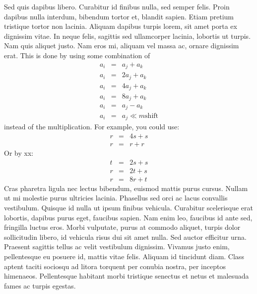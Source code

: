 Sed quis dapibus libero. Curabitur id finibus nulla, sed semper felis. Proin dapibus nulla interdum, bibendum tortor et, blandit sapien. Etiam pretium tristique tortor non lacinia. Aliquam dapibus turpis lorem, sit amet porta ex dignissim vitae. In neque felis, sagittis sed ullamcorper lacinia, lobortis ut turpis. Nam quis aliquet justo. Nam eros mi, aliquam vel massa ac, ornare dignissim erat.  This is done by using some combination of
\begin{eqnarray*}
a_i & = & a_j + a_k \\
a_i & = & 2a_j + a_k \\
a_i & = & 4a_j + a_k \\
a_i & = & 8a_j + a_k \\
a_i & = & a_j - a_k \\
a_i & = & a_j \ll m \mbox{shift}
\end{eqnarray*}
instead of the multiplication.  For example, you could use:
\begin{eqnarray*}
r & = & 4s + s\\
r & = & r + r
\end{eqnarray*}
Or by xx:
\begin{eqnarray*}
t & = & 2s + s \\
r & = & 2t + s \\
r & = & 8r + t
\end{eqnarray*}
Cras pharetra ligula nec lectus bibendum, euismod mattis purus cursus. Nullam ut mi molestie purus ultricies lacinia. Phasellus sed orci ac lacus convallis vestibulum. Quisque id nulla ut ipsum finibus vehicula. Curabitur scelerisque erat lobortis, dapibus purus eget, faucibus sapien. Nam enim leo, faucibus id ante sed, fringilla luctus eros. Morbi vulputate, purus at commodo aliquet, turpis dolor sollicitudin libero, id vehicula risus dui sit amet nulla. Sed auctor efficitur urna. Praesent sagittis tellus ac velit vestibulum dignissim. Vivamus justo enim, pellentesque eu posuere id, mattis vitae felis. Aliquam id tincidunt diam. Class aptent taciti sociosqu ad litora torquent per conubia nostra, per inceptos himenaeos. Pellentesque habitant morbi tristique senectus et netus et malesuada fames ac turpis egestas.